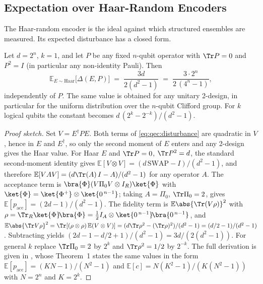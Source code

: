 \subsection{Expectation over Haar-Random Encoders}\label{sec:qec:haar}

The Haar-random encoder is the ideal against which structured ensembles are measured. Its expected disturbance has a closed form.

\begin{proposition}\label{prop:qec:haar}
Let $d=2^{n}$, $k=1$, and let $P$ be any fixed $n$-qubit operator with $\Tr P=0$ and $P^{2}=I$ (in particular any non-identity Pauli). Then
\begin{equation}\label{eq:qec:haar}
  \mathbb{E}_{E\sim\mathrm{Haar}}\big[\Delta(E,P)\big]\;=\;\frac{3d}{2(d^{2}-1)}\;=\;\frac{3\cdot 2^{n}}{2\,(4^{n}-1)},
\end{equation}
independently of $P$. The same value is obtained for any unitary 2-design, in particular for the uniform distribution over the $n$-qubit Clifford group. For $k$ logical qubits the constant becomes $d\,(2^{k}-2^{-k})/(d^{2}-1)$.
\end{proposition}
\begin{proof}[Proof sketch]
Set $V=E^{\dagger}PE$. Both terms of \cref{eq:qec:disturbance} are quadratic in $V$, hence in $E$ and $E^{\dagger}$, so only the second moment of $E$ enters and any 2-design gives the Haar value. For Haar $E$ and $\Tr P=0$, $\Tr P^{2}=d$, the standard second-moment identity gives $\mathbb{E}[V\otimes V]=(d\,\mathrm{SWAP}-I)/(d^{2}-1)$, and therefore $\mathbb{E}[VAV]=(d\Tr(A)\,I-A)/(d^{2}-1)$ for any operator $A$. The acceptance term is $\bra{\Phi}(V\Pi_0V\otimes I_R)\ket{\Phi}$ with $\ket{\Phi}=\ket{\Phi^{+}}\otimes\ket{0^{\,n-1}}$; taking $A=\Pi_0$, $\Tr\Pi_0=2$, gives $\mathbb{E}[p_{\mathrm{acc}}]=(2d-1)/(d^{2}-1)$. The fidelity term is $\mathbb{E}\abs{\Tr(V\rho)}^{2}$ with $\rho=\Tr_R\ket{\Phi}\!\bra{\Phi}=\tfrac12 I_A\otimes\ket{0^{\,n-1}}\!\bra{0^{\,n-1}}$, and $\mathbb{E}\abs{\Tr V\rho}^{2}=\Tr[(\rho\otimes\rho)\,\mathbb{E}(V\otimes V)]=(d\Tr\rho^{2}-(\Tr\rho)^{2})/(d^{2}-1)=(d/2-1)/(d^{2}-1)$. Subtracting yields $(2d-1-d/2+1)/(d^{2}-1)=3d/(2(d^{2}-1))$. For general $k$ replace $\Tr\Pi_0=2$ by $2^{k}$ and $\Tr\rho^{2}=1/2$ by $2^{-k}$. The full derivation is given in \cite{guo2026qecaudit}, whose Theorem~1 states the same values in the form $\mathbb{E}[p_{\mathrm{acc}}]=(KN-1)/(N^{2}-1)$ and $\mathbb{E}[c]=N(K^{2}-1)/(K(N^{2}-1))$ with $N=2^{n}$ and $K=2^{k}$.
\end{proof}

